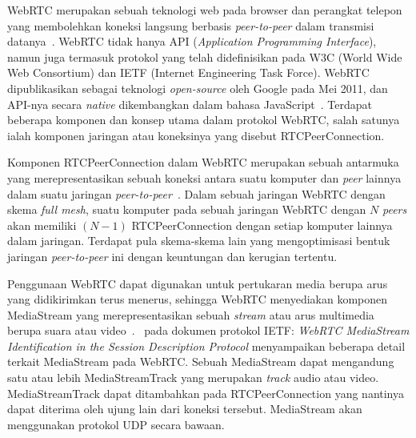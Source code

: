 WebRTC merupakan sebuah teknologi web pada browser dan perangkat telepon yang membolehkan koneksi langsung berbasis \textit{peer-to-peer} dalam transmisi datanya~\citep{rfc8835}. WebRTC tidak hanya API (\textit{Application Programming Interface}), namun juga termasuk protokol yang telah didefinisikan pada W3C (World Wide Web Consortium) dan IETF (Internet Engineering Task Force). WebRTC dipublikasikan sebagai teknologi \textit{open-source} oleh Google pada Mei 2011, dan API-nya secara \textit{native} dikembangkan dalam bahasa JavaScript~\citep{dutton2012getting}. Terdapat beberapa komponen dan konsep utama dalam protokol WebRTC, salah satunya ialah komponen jaringan atau koneksinya yang disebut RTCPeerConnection.

Komponen RTCPeerConnection dalam WebRTC merupakan sebuah antarmuka yang merepresentasikan sebuah koneksi antara suatu komputer dan \textit{peer} lainnya dalam suatu jaringan \textit{peer-to-peer}~\citep{rfc8835, rfc8834, jennings2013real}. Dalam sebuah jaringan WebRTC dengan skema \textit{full mesh}, suatu komputer pada sebuah jaringan WebRTC dengan $N$ \textit{peers} akan memiliki $(N-1)$ RTCPeerConnection dengan setiap komputer lainnya dalam jaringan. Terdapat pula skema-skema lain yang mengoptimisasi bentuk jaringan \textit{peer-to-peer} ini dengan keuntungan dan kerugian tertentu.

Penggunaan WebRTC dapat digunakan untuk pertukaran media berupa arus yang didikirimkan terus menerus, sehingga WebRTC menyediakan komponen MediaStream yang merepresentasikan sebuah \textit{stream} atau arus multimedia berupa suara atau video~\citep{sredojev2015webrtc, rfc8835}.~\cite{rfc8830} pada dokumen protokol IETF: \textit{WebRTC MediaStream Identification in the Session Description Protocol} menyampaikan beberapa detail terkait MediaStream pada WebRTC. Sebuah MediaStream dapat mengandung satu atau lebih MediaStreamTrack yang merupakan \textit{track} audio atau video. MediaStreamTrack dapat ditambahkan pada RTCPeerConnection yang nantinya dapat diterima oleh ujung lain dari koneksi tersebut. MediaStream akan menggunakan protokol UDP secara bawaan.

